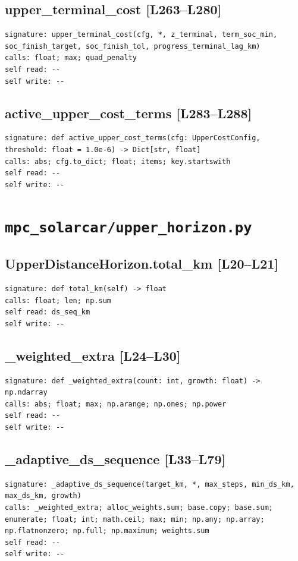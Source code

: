 \documentclass[a4paper,10pt,oneside]{book}
\begin{document}
\subsection*{upper\_terminal\_cost [L263--L280]}
\begin{lstlisting}[numbers=none]
signature: upper_terminal_cost(cfg, *, z_terminal, term_soc_min, soc_finish_target, soc_finish_tol, progress_terminal_lag_km)
calls: float; max; quad_penalty
self read: --
self write: --
\end{lstlisting}
\subsection*{active\_upper\_cost\_terms [L283--L288]}
\begin{lstlisting}[numbers=none]
signature: def active_upper_cost_terms(cfg: UpperCostConfig, threshold: float = 1.0e-6) -> Dict[str, float]
calls: abs; cfg.to_dict; float; items; key.startswith
self read: --
self write: --
\end{lstlisting}
\section{\texttt{mpc\_solarcar/upper\_horizon.py}}
\subsection*{UpperDistanceHorizon.total\_km [L20--L21]}
\begin{lstlisting}[numbers=none]
signature: def total_km(self) -> float
calls: float; len; np.sum
self read: ds_seq_km
self write: --
\end{lstlisting}
\subsection*{\_weighted\_extra [L24--L30]}
\begin{lstlisting}[numbers=none]
signature: def _weighted_extra(count: int, growth: float) -> np.ndarray
calls: abs; float; max; np.arange; np.ones; np.power
self read: --
self write: --
\end{lstlisting}
\subsection*{\_adaptive\_ds\_sequence [L33--L79]}
\begin{lstlisting}[numbers=none]
signature: _adaptive_ds_sequence(target_km, *, max_steps, min_ds_km, max_ds_km, growth)
calls: _weighted_extra; alloc_weights.sum; base.copy; base.sum; enumerate; float; int; math.ceil; max; min; np.any; np.array; np.flatnonzero; np.full; np.maximum; weights.sum
self read: --
self write: --
\end{lstlisting}
\end{document}
